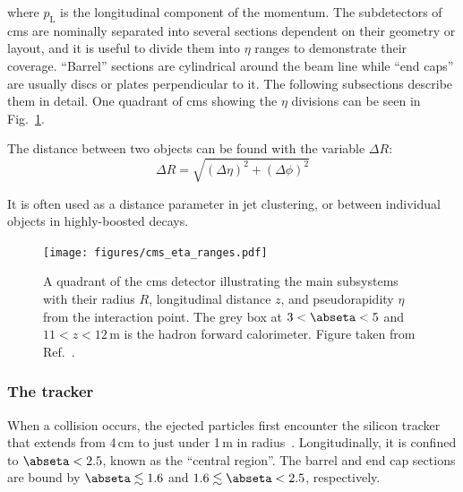 where $p_{\mathrm{L}}$ is the longitudinal component of the momentum. The subdetectors of \acrshort{cms} are nominally separated into several sections dependent on their geometry or layout, and it is useful to divide them into $\eta$ ranges to demonstrate their coverage. ``Barrel'' sections are cylindrical around the beam line while ``end caps'' are usually discs or plates perpendicular to it. The following subsections describe them in detail. One quadrant of \acrshort{cms} showing the $\eta$ divisions can be seen in Fig.~\ref{fig:cms_eta_bounds}.

The distance between two objects can be found with the variable $\Delta R$:
\begin{equation}
\Delta R = \sqrt{(\Delta \eta)^2 + (\Delta \phi)^2}
\label{eq:delta_r}
\end{equation}

It is often used as a distance parameter in jet clustering, or between individual objects in highly-boosted decays.

\begin{figure}[htbp]
    \centering
    \texttt{[image: figures/cms\_eta\_ranges.pdf]}
    \caption[A quadrant of the CMS detector illustrating the main subsystems with their radius $R$, longitudinal distance $z$, and pseudorapidity $\eta$ from the interaction point]{A quadrant of the \acrshort{cms} detector illustrating the main subsystems with their radius $R$, longitudinal distance $z$, and pseudorapidity $\eta$ from the interaction point. The grey box at $3 < \abseta < 5$ and $11 < z < 12$\,m is the hadron forward calorimeter. Figure taken from Ref.~.}
    \label{fig:cms_eta_bounds}
\end{figure}




\subsubsection{The tracker}
\label{subsubsec:cms_tracker}

When a collision occurs, the ejected particles first encounter the silicon tracker that extends from 4\,cm to just under 1\,m in radius~\cite{Karimäki:368412,CERN-LHCC-2000-016}. Longitudinally, it is confined to $\abseta < \text{2.5}$, known as the ``central region''. The barrel and end cap sections are bound by $\abseta \lesssim \text{1.6}$ and $\text{1.6} \lesssim \abseta < \text{2.5}$, respectively.

